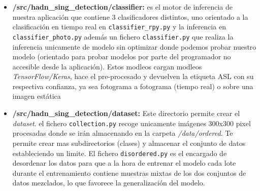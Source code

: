 \begin{itemize}
    \item \textbf{/src/hadn\_sing\_detection/classifier:} es el motor de inferencia de nuestra aplicación que contiene 3 clasificadores distintos, uno orientado a la clasificación en tiempo real en \texttt{classifier\_rpy.py} y la inferencia en \texttt{classifier\_photo.py} además un fichero \texttt{classifier.py} que realiza la inferencia unicamente de modelo sin optimizar donde podemos probar nuestro modelo (orientado para probar modelos por parte del programador no accesible desde la aplicación).
    Estos modleos cargan modleos \textit{TensorFlow/Keras}, hace el pre-procesado y devuelven la etiqueta ASL con su respectiva confianza, ya sea fotograma a fotograma (tiempo real) o sobre una imagen estática

    \item \textbf{/src/hadn\_sing\_detection/dataset:} Este directorio permite crear el \textit{dataset}. el fichero \texttt{collection.py} recoge unicamente imágenes 300x300 pixel procesadas donde se irán almacenando en la carpeta \textit{/data/ordered}. Te permite crear mas subdirectorios (clases) y almacenar el conjunto de datos estableciendo un limite.
    El fichero \texttt{disordered.py} es el encargado de desordenar los datos para que a la hora de entrenar el modelo cada lote durante el entrenamiento contiene muestras mixtas de los dos conjuntos de datos mezclados, lo que favorece la generalización del modelo.
    

\end{itemize}
